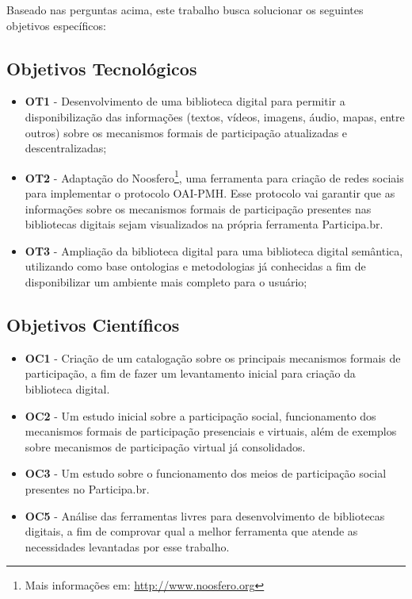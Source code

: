 Baseado nas perguntas acima, este trabalho busca solucionar os seguintes objetivos específicos: 

\subsection*{Objetivos Tecnológicos}

\begin{itemize}
\item \textbf{OT1} - Desenvolvimento de uma biblioteca digital para permitir a disponibilização das informações (textos, vídeos, imagens, áudio, mapas, entre outros) sobre os mecanismos formais de participação atualizadas e descentralizadas;
\item \textbf{OT2} - Adaptação do Noosfero\footnote{Mais informações em: \url{http://www.noosfero.org}}, uma ferramenta para criação de redes sociais para implementar o protocolo OAI-PMH. Esse protocolo vai garantir que as informações sobre os mecanismos formais de participação presentes nas bibliotecas digitais sejam visualizados na própria ferramenta Participa.br.
\item \textbf{OT3} - Ampliação da biblioteca digital para uma biblioteca digital semântica, utilizando como base ontologias e metodologias já conhecidas a fim de disponibilizar um ambiente mais completo para o usuário;
\end{itemize}

\subsection*{Objetivos Científicos}

\begin{itemize}
\item \textbf{OC1} - Criação de um catalogação sobre os principais mecanismos formais de participação, a fim de fazer um levantamento inicial para criação da biblioteca digital.
\item \textbf{OC2} - Um estudo inicial sobre a participação social, funcionamento dos mecanismos formais de participação presenciais e virtuais, além de exemplos sobre mecanismos de participação virtual já consolidados.
\item \textbf{OC3} - Um estudo sobre o funcionamento dos meios de participação social presentes no Participa.br.
\item \textbf{OC5} - Análise das ferramentas livres para desenvolvimento de bibliotecas digitais, a fim de comprovar qual a melhor ferramenta que atende as necessidades levantadas por esse trabalho.
\end{itemize}
	 	

